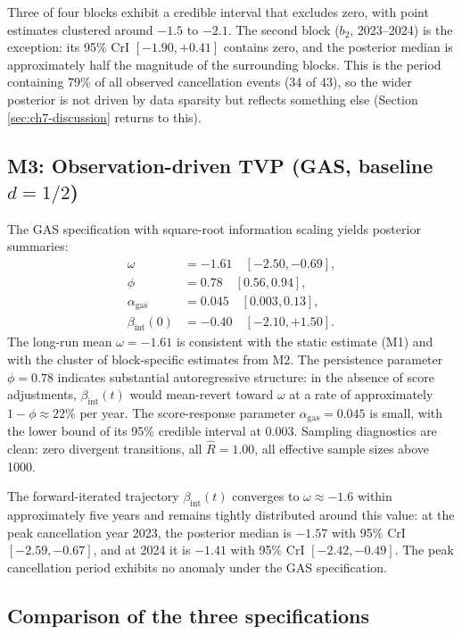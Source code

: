 \documentclass[11pt,a4paper]{article}
\newcommand{\bint}{\beta_{\mathrm{int}}}
\begin{document}
Three of four blocks exhibit a credible interval that excludes zero, with point estimates clustered around $-1.5$ to $-2.1$. The second block ($b_2$, 2023--2024) is the exception: its 95\% CrI $[-1.90, +0.41]$ contains zero, and the posterior median is approximately half the magnitude of the surrounding blocks. This is the period containing 79\% of all observed cancellation events (34 of 43), so the wider posterior is not driven by data sparsity but reflects something else (Section \ref{sec:ch7-discussion} returns to this).

\subsection{M3: Observation-driven TVP (GAS, baseline $d=1/2$)}
\label{sec:ch7-m3}

The GAS specification with square-root information scaling yields posterior summaries:
\begin{align*}
\omega &= -1.61 \quad [-2.50, -0.69], \\
\phi &= 0.78 \quad [0.56, 0.94], \\
\alpha_{\mathrm{gas}} &= 0.045 \quad [0.003, 0.13], \\
\bint(0) &= -0.40 \quad [-2.10, +1.50].
\end{align*}
The long-run mean $\omega = -1.61$ is consistent with the static estimate (M1) and with the cluster of block-specific estimates from M2. The persistence parameter $\phi = 0.78$ indicates substantial autoregressive structure: in the absence of score adjustments, $\bint(t)$ would mean-revert toward $\omega$ at a rate of approximately $1 - \phi \approx 22\%$ per year. The score-response parameter $\alpha_{\mathrm{gas}} = 0.045$ is small, with the lower bound of its 95\% credible interval at 0.003. Sampling diagnostics are clean: zero divergent transitions, all $\hat R = 1.00$, all effective sample sizes above 1000.

The forward-iterated trajectory $\bint(t)$ converges to $\omega \approx -1.6$ within approximately five years and remains tightly distributed around this value: at the peak cancellation year 2023, the posterior median is $-1.57$ with 95\% CrI $[-2.59, -0.67]$, and at 2024 it is $-1.41$ with 95\% CrI $[-2.42, -0.49]$. The peak cancellation period exhibits no anomaly under the GAS specification.

\subsection{Comparison of the three specifications}
\end{document}

